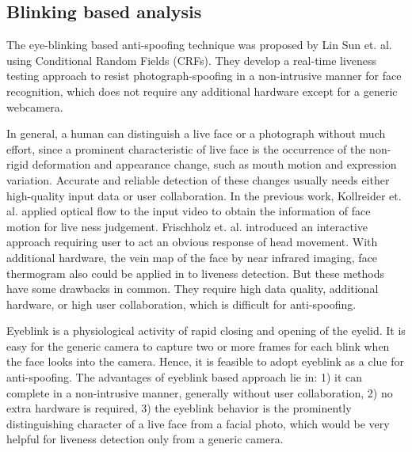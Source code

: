 \documentclass[journal]{IEEEtran}
\begin{document}
\subsection{Blinking based analysis}

The eye-blinking based anti-spoofing technique was proposed by Lin Sun et. al. \cite{pan2007eyeblink} using Conditional Random Fields (CRFs). They develop a real-time liveness testing approach to resist photograph-spoofing in a non-intrusive manner for face recognition, which does not require any additional hardware except for a generic webcamera.

In general, a human can distinguish a live face or a photograph without much effort, since a prominent characteristic of live face is the occurrence of the non-rigid deformation and appearance change, such as mouth motion and expression variation. Accurate and reliable detection of these changes usually needs either high-quality input data or user collaboration. In the previous work, Kollreider et. al. \cite{kollreider2005evaluating} applied optical flow to the input video to obtain the information of face motion for live ness judgement. Frischholz et. al. \cite{frischholz2003avoiding} introduced an interactive approach requiring user to act an obvious response of head movement. With additional hardware, the vein map of the face by near infrared imaging, face thermogram \cite{socolinsky2003face} also could be applied in to liveness detection. But these methods have some drawbacks in common. They require high data quality, additional hardware, or high user collaboration, which is difficult for anti-spoofing.

Eyeblink is a physiological activity of rapid closing and opening of the eyelid. It is easy for the generic camera to capture two or more frames for each blink when the face looks into the camera. Hence, it is feasible to adopt eyeblink as a clue for anti-spoofing. The advantages of eyeblink based approach lie in: 1) it can complete in a non-intrusive manner, generally without user collaboration, 2) no extra hardware is required, 3) the eyeblink behavior is the prominently distinguishing character of a live face from a facial photo, which would be very helpful for liveness detection only from a generic camera.
\end{document}
